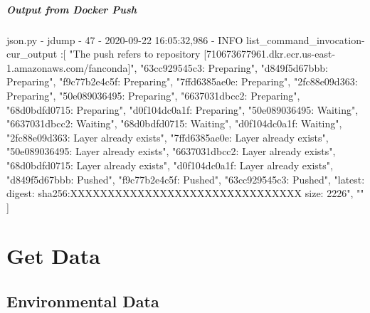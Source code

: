 \documentclass[
]{book}
\newenvironment{Shaded}{\begin{snugshade}}{\end{snugshade}}
\newcommand{\ExtensionTok}[1]{#1}
\newcommand{\NormalTok}[1]{#1}
\newcommand{\StringTok}[1]{\textcolor[rgb]{0.31,0.60,0.02}{#1}}
\begin{document}
\hypertarget{output-from-docker-push}{%
\paragraph{Output from Docker Push}\label{output-from-docker-push}}

\begin{Shaded}
\begin{Highlighting}[]
\ExtensionTok{json.py}\NormalTok{ {-} jdump {-} 47 {-}  2020{-}09{-}22 16:05:32,986 {-} INFO list\_command\_invocation{-}cur\_output}
\NormalTok{:[}
    \StringTok{"The push refers to repository [710673677961.dkr.ecr.us{-}east{-}1.amazonaws.com/fanconda]"}\NormalTok{,}
    \StringTok{"63cc929545c3: Preparing"}\NormalTok{,}
    \StringTok{"d849f5d67bbb: Preparing"}\NormalTok{,}
    \StringTok{"f9c77b2e4c5f: Preparing"}\NormalTok{,}
    \StringTok{"7ffd6385ae0e: Preparing"}\NormalTok{,}
    \StringTok{"2fc88e09d363: Preparing"}\NormalTok{,}
    \StringTok{"50e089036495: Preparing"}\NormalTok{,}
    \StringTok{"6637031dbcc2: Preparing"}\NormalTok{,}
    \StringTok{"68d0bdfd0715: Preparing"}\NormalTok{,}
    \StringTok{"d0f104dc0a1f: Preparing"}\NormalTok{,}
    \StringTok{"50e089036495: Waiting"}\NormalTok{,}
    \StringTok{"6637031dbcc2: Waiting"}\NormalTok{,}
    \StringTok{"68d0bdfd0715: Waiting"}\NormalTok{,}
    \StringTok{"d0f104dc0a1f: Waiting"}\NormalTok{,}
    \StringTok{"2fc88e09d363: Layer already exists"}\NormalTok{,}
    \StringTok{"7ffd6385ae0e: Layer already exists"}\NormalTok{,}
    \StringTok{"50e089036495: Layer already exists"}\NormalTok{,}
    \StringTok{"6637031dbcc2: Layer already exists"}\NormalTok{,}
    \StringTok{"68d0bdfd0715: Layer already exists"}\NormalTok{,}
    \StringTok{"d0f104dc0a1f: Layer already exists"}\NormalTok{,}
    \StringTok{"d849f5d67bbb: Pushed"}\NormalTok{,}
    \StringTok{"f9c77b2e4c5f: Pushed"}\NormalTok{,}
    \StringTok{"63cc929545c3: Pushed"}\NormalTok{,}
    \StringTok{"latest: digest: sha256:XXXXXXXXXXXXXXXXXXXXXXXXXXXXXXX size: 2226"}\NormalTok{,}
    \StringTok{""}
\NormalTok{]}
\end{Highlighting}
\end{Shaded}

\hypertarget{get-data}{%
\chapter{Get Data}\label{get-data}}

\hypertarget{environmental-data}{%
\section{Environmental Data}\label{environmental-data}}
\end{document}
